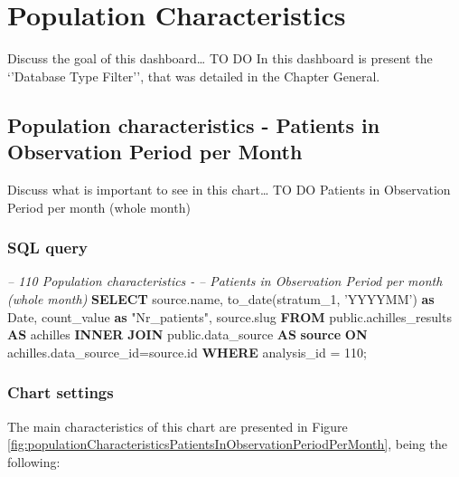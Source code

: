 \documentclass[]{book}
\newenvironment{Shaded}{\begin{snugshade}}{\end{snugshade}}
\newcommand{\KeywordTok}[1]{\textcolor[rgb]{0.13,0.29,0.53}{\textbf{#1}}}
\newcommand{\DataTypeTok}[1]{\textcolor[rgb]{0.13,0.29,0.53}{#1}}
\newcommand{\DecValTok}[1]{\textcolor[rgb]{0.00,0.00,0.81}{#1}}
\newcommand{\StringTok}[1]{\textcolor[rgb]{0.31,0.60,0.02}{#1}}
\newcommand{\CommentTok}[1]{\textcolor[rgb]{0.56,0.35,0.01}{\textit{#1}}}
\newcommand{\OtherTok}[1]{\textcolor[rgb]{0.56,0.35,0.01}{#1}}
\newcommand{\FunctionTok}[1]{\textcolor[rgb]{0.00,0.00,0.00}{#1}}
\newcommand{\NormalTok}[1]{#1}
\begin{document}
\chapter{Population Characteristics}\label{population-characteristics}

Discuss the goal of this dashboard\ldots{} TO DO In this dashboard is
present the `'Database Type Filter'', that was detailed in the Chapter
General.

\section{Population characteristics - Patients in Observation Period per
Month}\label{population-characteristics---patients-in-observation-period-per-month}

Discuss what is important to see in this chart\ldots{} TO DO Patients in
Observation Period per month (whole month)

\subsection{SQL query}\label{sql-query-10}

\begin{Shaded}
\begin{Highlighting}[]
\CommentTok{-- 110    Population characteristics - }
\CommentTok{-- Patients in Observation Period per month (whole month)}
\KeywordTok{SELECT}\NormalTok{ source.name, }
       \FunctionTok{to_date}\NormalTok{(stratum_1, }\StringTok{'YYYYMM'}\NormalTok{) }\KeywordTok{as} \DataTypeTok{Date}\NormalTok{,}
\NormalTok{       count_value }\KeywordTok{as} \OtherTok{"Nr_patients"}\NormalTok{,}
\NormalTok{       source.slug}
\KeywordTok{FROM}\NormalTok{ public.achilles_results }\KeywordTok{AS}\NormalTok{ achilles }
    \KeywordTok{INNER} \KeywordTok{JOIN}\NormalTok{ public.data_source }\KeywordTok{AS} \KeywordTok{source} \KeywordTok{ON} 
\NormalTok{      achilles.data_source_id=source.id}
\KeywordTok{WHERE}\NormalTok{ analysis_id = }\DecValTok{110}\NormalTok{;}
\end{Highlighting}
\end{Shaded}

\subsection{Chart settings}\label{chart-settings-10}

The main characteristics of this chart are presented in Figure
\ref{fig:populationCharacteristicsPatientsInObservationPeriodPerMonth},
being the following:
\end{document}

